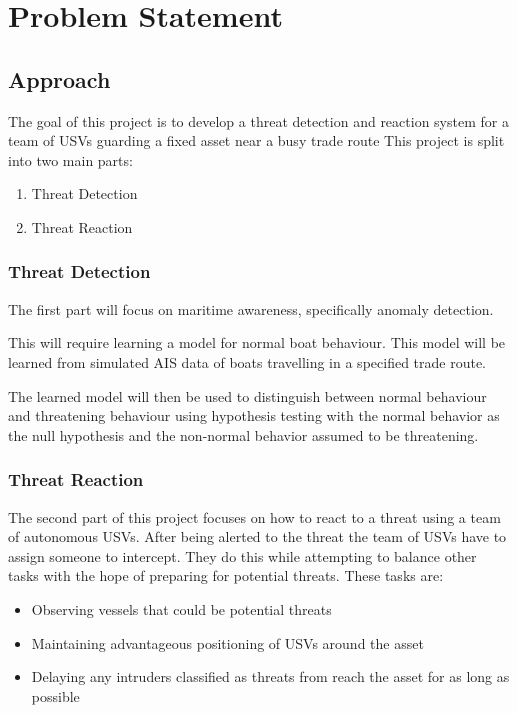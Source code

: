 \documentclass[bsc,frontabs,twoside,singlespacing,parskip,deptreport]{infthesis}     %
\begin{document}
\section{Problem Statement}
\subsection{Approach}
The goal of this project is to develop a threat detection and reaction system for a team of USVs guarding a fixed asset near a busy trade route
This project is split into two main parts:
\begin{enumerate}
    \item Threat Detection
    \item Threat Reaction
\end{enumerate}

\subsubsection{Threat Detection}
The first part will focus on maritime awareness, specifically anomaly detection.

This will require learning a model for normal boat behaviour. This model will be learned from simulated AIS data of boats travelling in a specified trade route.

The learned model will then be used to distinguish between normal behaviour and threatening behaviour using hypothesis testing with the normal behavior as the null hypothesis and the non-normal behavior assumed to be threatening.

\subsubsection{Threat Reaction}
The second part of this project focuses on how to react to a threat using a team of autonomous USVs.
After being alerted to the threat the team of USVs have to assign someone to intercept. They do this while attempting to balance other tasks with the hope of preparing for potential threats.
These tasks are:
\begin{itemize}
    \item Observing vessels that could be potential threats
    \item Maintaining advantageous positioning of USVs around the asset
    \item Delaying any intruders classified as threats from reach the asset for as long as possible
\end{itemize}
\end{document}
